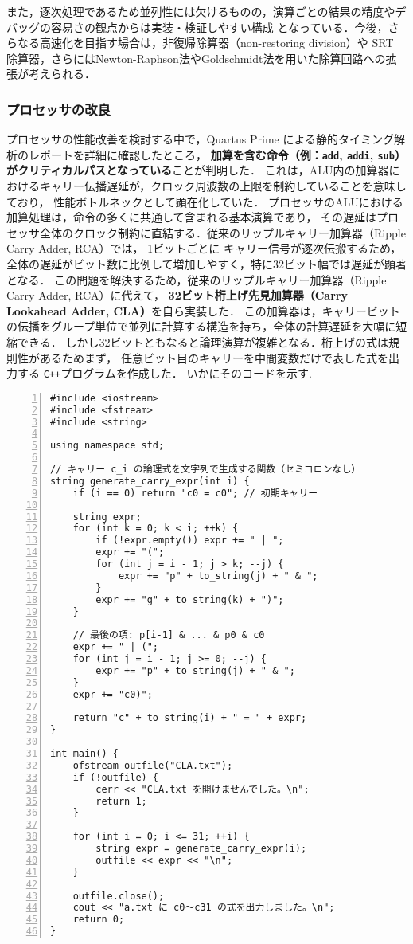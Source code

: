 \documentclass[autodetect-engine,dvi=dvipdfmx,ja=standard,
               a4j,11pt]{bxjsarticle}
\begin{document}
また，逐次処理であるため並列性には欠けるものの，演算ごとの結果の精度やデバッグの容易さの観点からは実装・検証しやすい構成
となっている．今後，さらなる高速化を目指す場合は，非復帰除算器（non-restoring division）や 
SRT 除算器，さらにはNewton-Raphson法やGoldschmidt法を用いた除算回路への拡張が考えられる．
\subsubsection{プロセッサの改良}
プロセッサの性能改善を検討する中で，Quartus Prime による静的タイミング解析のレポートを詳細に確認したところ，
\textbf{加算を含む命令（例：\texttt{add}, \texttt{addi}, \texttt{sub}）がクリティカルパスとなっている}ことが判明した．
これは，ALU内の加算器におけるキャリー伝播遅延が，クロック周波数の上限を制約していることを意味しており，
性能ボトルネックとして顕在化していた．
プロセッサのALUにおける加算処理は，命令の多くに共通して含まれる基本演算であり，
その遅延はプロセッサ全体のクロック制約に直結する．従来のリップルキャリー加算器（Ripple Carry Adder, RCA）では，
1ビットごとに
キャリー信号が逐次伝搬するため，全体の遅延がビット数に比例して増加しやすく，特に32ビット幅では遅延が顕著となる．
この問題を解決するため，従来のリップルキャリー加算器（Ripple Carry Adder, RCA）に代えて，
\textbf{32ビット桁上げ先見加算器（Carry Lookahead Adder, CLA）}を自ら実装した．
この加算器は，キャリービットの伝播をグループ単位で並列に計算する構造を持ち，全体の計算遅延を大幅に短縮できる．
しかし32ビットともなると論理演算が複雑となる．桁上げの式は規則性があるためまず，
任意ビット目のキャリーを中間変数だけで表した式を出力する
\verb|C++|プログラムを作成した．
いかにそのコードを示す.
\begin{Verbatim}[numbers=left, xleftmargin=8mm, numbersep=6pt,
    fontsize=\small, baselinestretch=0.8]
#include <iostream>
#include <fstream>
#include <string>

using namespace std;

// キャリー c_i の論理式を文字列で生成する関数（セミコロンなし）
string generate_carry_expr(int i) {
    if (i == 0) return "c0 = c0"; // 初期キャリー

    string expr;
    for (int k = 0; k < i; ++k) {
        if (!expr.empty()) expr += " | ";
        expr += "(";
        for (int j = i - 1; j > k; --j) {
            expr += "p" + to_string(j) + " & ";
        }
        expr += "g" + to_string(k) + ")";
    }

    // 最後の項: p[i-1] & ... & p0 & c0
    expr += " | (";
    for (int j = i - 1; j >= 0; --j) {
        expr += "p" + to_string(j) + " & ";
    }
    expr += "c0)";

    return "c" + to_string(i) + " = " + expr;
}

int main() {
    ofstream outfile("CLA.txt");
    if (!outfile) {
        cerr << "CLA.txt を開けませんでした。\n";
        return 1;
    }

    for (int i = 0; i <= 31; ++i) {
        string expr = generate_carry_expr(i);
        outfile << expr << "\n";
    }

    outfile.close();
    cout << "a.txt に c0〜c31 の式を出力しました。\n";
    return 0;
}    
\end{Verbatim}
\end{document}

